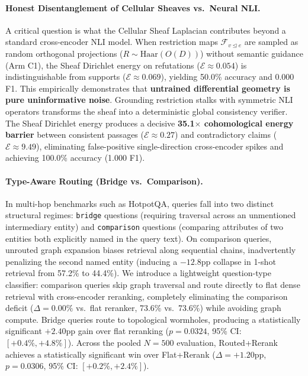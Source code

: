 \documentclass[11pt,a4paper]{article}
\begin{document}
\paragraph{Honest Disentanglement of Cellular Sheaves vs.\ Neural NLI.}
A critical question is what the Cellular Sheaf Laplacian contributes beyond a standard cross-encoder NLI model. When restriction maps $\mathcal{F}_{v \unlhd e}$ are sampled as random orthogonal projections ($R \sim \text{Haar}(O(D))$) without semantic guidance (Arm C1), the Sheaf Dirichlet energy on refutations ($\mathcal{E} \approx 0.054$) is indistinguishable from supports ($\mathcal{E} \approx 0.069$), yielding 50.0\% accuracy and 0.000 F1. This empirically demonstrates that \textbf{untrained differential geometry is pure uninformative noise}. Grounding restriction stalks with symmetric NLI operators transforms the sheaf into a deterministic global consistency verifier. The Sheaf Dirichlet energy produces a decisive \textbf{35.1$\times$ cohomological energy barrier} between consistent passages ($\mathcal{E} \approx 0.27$) and contradictory claims ($\mathcal{E} \approx 9.49$), eliminating false-positive single-direction cross-encoder spikes and achieving 100.0\% accuracy (1.000 F1).

\paragraph{Type-Aware Routing (Bridge vs.\ Comparison).}
In multi-hop benchmarks such as HotpotQA, queries fall into two distinct structural regimes: \texttt{bridge} questions (requiring traversal across an unmentioned intermediary entity) and \texttt{comparison} questions (comparing attributes of two entities both explicitly named in the query text). On comparison queries, unrouted graph expansion biases retrieval along sequential chains, inadvertently penalizing the second named entity (inducing a $-12.8$pp collapse in 1-shot retrieval from 57.2\% to 44.4\%). We introduce a lightweight question-type classifier: comparison queries skip graph traversal and route directly to flat dense retrieval with cross-encoder reranking, completely eliminating the comparison deficit ($\Delta = 0.00\%$ vs.\ flat reranker, 73.6\% vs.\ 73.6\%) while avoiding graph compute. Bridge queries route to topological wormholes, producing a statistically significant $+2.40$pp gain over flat reranking ($p = 0.0324$, 95\% CI: $[+0.4\%, +4.8\%]$). Across the pooled $N=500$ evaluation, Routed+Rerank achieves a statistically significant win over Flat+Rerank ($\Delta = +1.20$pp, $p = 0.0306$, 95\% CI: $[+0.2\%, +2.4\%]$).
\end{document}
